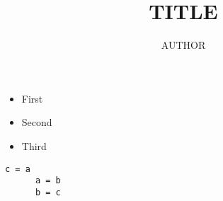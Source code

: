 \documentclass[compress,red]{beamer}
\title{TITLE}
\author{AUTHOR}
\begin{document}
\maketitle

\section{}
\subsection{}
\begin{frame}[fragile]
\frametitle{}
  \begin{itemize}[<+->]
     \item First
	\item Second
	\item Third
  \end{itemize}
  \begin{lstlisting}[label=ruby2_1,caption=Change vars]
      c = a
      a = b
      b = c
    \end{lstlisting}
\end{frame}
\end{document}
